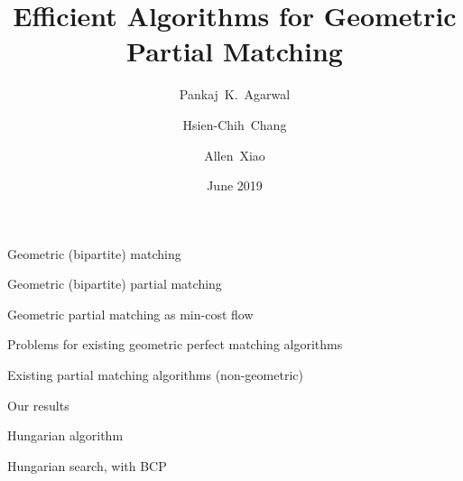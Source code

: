\documentclass[xcolor={dvipsnames,usenames}]{beamer}
\title{Efficient Algorithms for Geometric Partial Matching}
\author[Allen Xiao]
{
	Pankaj~K.~Agarwal \and
	Hsien-Chih~Chang \and
	Allen~Xiao
}
\institute[SoCG 2019]
{
	Duke University
}
\date{June 2019}
\begin{document}
\begin{frame}
\maketitle
\end{frame}


\begin{frame}{Geometric (bipartite) matching}
\end{frame}

\begin{frame}{Geometric (bipartite) partial matching}
\end{frame}

\begin{frame}{Geometric partial matching as min-cost flow}
\end{frame}

\begin{frame}{Problems for existing geometric perfect matching algorithms}
\end{frame}

\begin{frame}{Existing partial matching algorithms (non-geometric)}


\end{frame}

\begin{frame}{Our results}
\end{frame}


\begin{frame}{Hungarian algorithm}
\end{frame}

\begin{frame}{Hungarian search, with BCP}
\end{frame}
\end{document}
